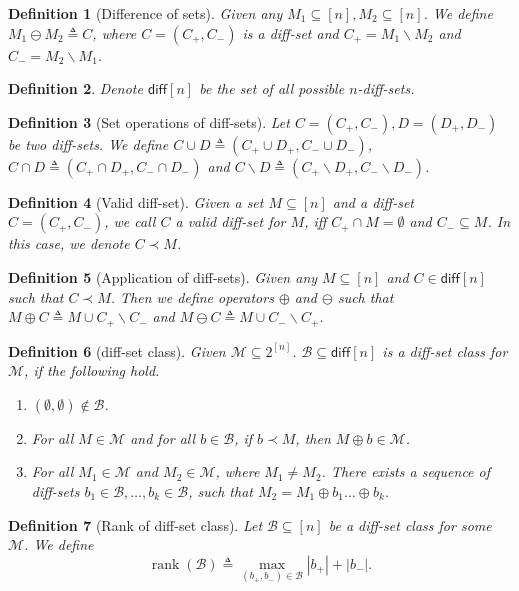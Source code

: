 \documentclass{article}
\newtheorem{define}{Definition}
\newcommand{\M}{\mathcal M}
\newcommand{\diff}{\mathsf{diff}}
\newcommand{\diffvalid}{\prec}
\newcommand{\B}{\mathcal B}
\newcommand{\del}{\backslash}
\DeclareMathOperator{\rank}{rank}
\begin{document}
\begin{spacing}{1.1}
\begin{define}[Difference of sets]
Given any $M_1\subseteq[n],M_2\subseteq[n]$. We define $M_1\ominus M_2 \triangleq C$, where $C=(C_+,C_-)$ is a diff-set and
$C_+ = M_1 \del M_2$ and $C_- = M_2\del M_1$.
\end{define}

\begin{define}
Denote $\diff[n]$ be the set of all possible $n$-diff-sets.
\end{define}

\begin{define}[Set operations of diff-sets] 
Let $C=(C_+,C_-), D=(D_+,D_-)$ be two diff-sets. 
We define $C\cup D \triangleq (C_+\cup D_+, C_-\cup D_-)$,
$C\cap D \triangleq (C_+\cap D_+, C_-\cap D_-)$
and $C\del D \triangleq (C_+\del D_+, C_-\del D_-)$.
\end{define}

\begin{define}[Valid diff-set]
Given a set $M \subseteq [n]$ and a diff-set $C=(C_+,C_-)$, we call $C$ a \emph{valid diff-set} for $M$, iff $C_+ \cap M = \emptyset$ and $C_- \subseteq M$.
In this case, we denote $C\diffvalid M$.
\end{define}

\begin{define}[Application of diff-sets]
Given any $M \subseteq [n]$ and $C \in \diff[n]$ such that $C \diffvalid M$.
Then we define operators $\oplus$ and $\ominus$ such that $M \oplus C \triangleq M\cup C_+ \del C_-$ and $M \ominus C \triangleq M\cup C_- \del C_+$.
\end{define}

\begin{define}[diff-set class]
\label{define:diff-class}
Given $\M \subseteq 2^{[n]}$. $\B \subseteq \diff[n]$ is a diff-set class for $\M$, if the following hold.
\begin{enumerate} 
\item $(\emptyset,\emptyset)\not\in \B$.
\item For all $M\in \M$ and for all $b\in \B$, if $b\diffvalid M$, then $M\oplus b \in \M$.
\item For all $M_1 \in \M$ and $M_2\in \M$, where $M_1\not=M_2$. 
	  There exists a sequence of diff-sets $b_1 \in \B,\ldots,b_k \in \B$, such that 
	  $M_2 = M_1\oplus b_1 \ldots \oplus b_k$.
\end{enumerate}
\end{define}

\begin{define}[Rank of diff-set class]
Let $\B \subseteq [n]$ be a diff-set class for some $\M$. We define
$$
\rank(\B) \triangleq \max_{(b_+,b_-) \in \B} |b_+|+|b_-|.
$$
\end{define}


\end{spacing}
\end{document}
